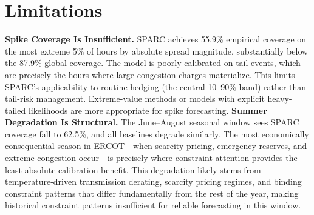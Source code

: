 \documentclass[twoside]{article}
\begin{document}
\section{Limitations}
\textbf{Spike Coverage Is Insufficient.} SPARC achieves 55.9\% empirical coverage on the most extreme 5\% of hours by absolute spread magnitude, substantially below the 87.9\% global coverage. The model is poorly calibrated on tail events, which are precisely the hours where large congestion charges materialize. This limits SPARC's applicability to routine hedging (the central 10--90\% band) rather than tail-risk management. Extreme-value methods or models with explicit heavy-tailed likelihoods are more appropriate for spike forecasting.
\textbf{Summer Degradation Is Structural.} The June--August seasonal window sees SPARC coverage fall to 62.5\%, and all baselines degrade similarly. The most economically consequential season in ERCOT---when scarcity pricing, emergency reserves, and extreme congestion occur---is precisely where constraint-attention provides the least absolute calibration benefit. This degradation likely stems from temperature-driven transmission derating, scarcity pricing regimes, and binding constraint patterns that differ fundamentally from the rest of the year, making historical constraint patterns insufficient for reliable forecasting in this window.
\end{document}

